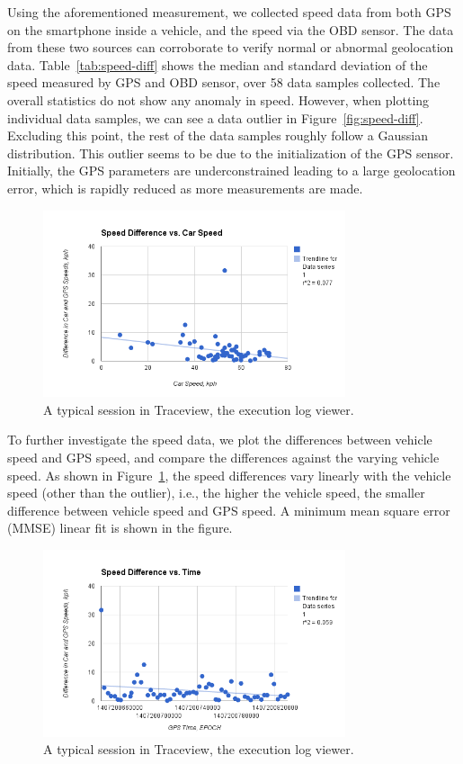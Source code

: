 Using the aforementioned measurement, we collected speed data from both GPS 
on the smartphone inside a vehicle, and the speed via the OBD sensor. 
The data from these two sources can corroborate to verify normal or abnormal 
geolocation data. Table~\ref{tab:speed-diff} shows the median and standard deviation
of the speed measured by GPS and OBD sensor, over 58 data samples collected. 
The overall statistics do not show any anomaly in speed. However, when plotting 
individual data samples, we can see a data outlier in Figure~\ref{fig:speed-diff}. 
Excluding this point, the rest of the data samples roughly follow a Gaussian 
distribution. This outlier seems to be due to the initialization of the
GPS sensor.  Initially, the GPS parameters are underconstrained leading to a large 
geolocation error, which is rapidly reduced as more measurements are made.


\begin{figure}
\centering
\includegraphics[width=3.5in]{car.png}
\caption{A typical session in Traceview, the execution log viewer.}
\label{fig:car}
\end{figure}

To further investigate the speed data, we plot the differences between 
vehicle speed and GPS speed, and compare the differences against 
the varying vehicle speed. As shown in Figure~\ref{fig:car}, the speed 
differences vary linearly with the vehicle speed 
(other than the outlier), i.e., the 
higher the vehicle speed, the smaller difference between vehicle 
speed and GPS speed. 
A minimum mean square error (MMSE) linear fit is shown in the figure.

\begin{figure}
\centering
\includegraphics[width=3.5in]{time.png}
\caption{A typical session in Traceview, the execution log viewer.}
\label{fig:time}
\end{figure}

